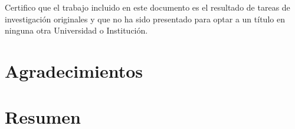 \documentclass[spanish,a4paper,oneside,12pt,openright]{book}
\begin{document}
\thispagestyle{empty}
\mbox{}
\newpage

 \cleardoublepage

Certifico que el trabajo incluido en este documento es el resultado de tareas de investigación
originales y que no ha sido presentado para optar a un título en ninguna otra
Universidad o Institución.

\vspace{3cm}
\begin{flushright}
\tfcAuthor
\end{flushright}
\cleardoublepage




\clearpage
\thispagestyle{empty}
\phantom{p. 2}
\clearpage

\chapter*{Agradecimientos} %



\phantom{p. 1}
\clearpage
\thispagestyle{empty}
\phantom{p. 2}
\clearpage

\chapter*{Resumen} %

\end{document}
